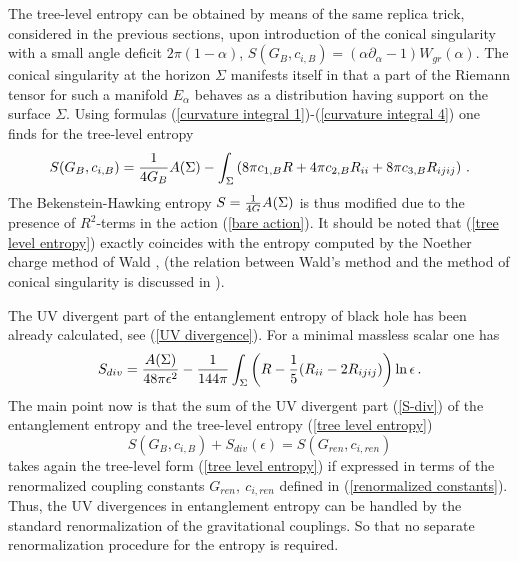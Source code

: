\documentclass[12pt]{article}
\def\be{\begin{eqnarray}}
\def\ee{\end{eqnarray}}
\def\lb{\label}
\def\o{\over}
\begin{document}
The tree-level entropy can be obtained by means of  the same replica trick, considered in the previous sections,  upon 
introduction of the conical singularity with a small angle deficit $2\pi(1-\alpha)$, $S(G_B,c_{i,B})=(\alpha\partial_\alpha-1)W_{gr}(\alpha)$. The conical singularity at
the horizon
$\Sigma$ manifests itself in that a part of the Riemann tensor for
such a
manifold $E_\alpha$ behaves as a distribution having support on
the surface
$\Sigma$.   Using formulas (\ref{curvature integral 1})-(\ref{curvature integral 4}) one finds
for the tree-level entropy
\begin{equation}
S(G_B, c_{i,B})= {1 \over 4G_B} A(\Sigma)-\int_{\Sigma} \left( 8\pi
c_{1,B} R
+4\pi c_{2,B}R_{ii}+8\pi  c_{3,B}R_{ijij} \right)\, .
\label{tree level entropy}
\end{equation}
The Bekenstein-Hawking entropy  $S={1 \over  4G}A(\Sigma)$ is thus
modified due to the  presence of 
$R^2$-terms in the action  (\ref{bare action}). 
It should be noted that (\ref{tree level entropy}) exactly coincides with the entropy
computed by
the Noether charge method of Wald \cite{Wald:1993nt}, \cite{Jacobson:1993vj} (the relation between Wald's method and the method of conical singularity is discussed in \cite{Iyer:1995kg}).

The UV divergent part of the entanglement entropy of black hole has been already calculated, see (\ref{UV divergence}).
For a minimal massless scalar one has 
\be
S_{div}={A(\Sigma)\o 48\pi\epsilon^2}-{1\o 144\pi}\int_\Sigma \left({R}-{1\o 5}({R}_{ii}-2{R}_{ijij})\right)\ln\epsilon\, .
\lb{S-div}
\ee
The main point now is that the sum of the UV divergent part (\ref{S-div}) of the entanglement
entropy
 and  the tree-level entropy
(\ref{tree level entropy})
\begin{equation}
S(G_B, c_{i,B})+S_{div}(\epsilon)=S(G_{ren}, c_{i, ren})
\label{entropy renormalized}
\end{equation}
takes again the tree-level form (\ref{tree level entropy}) if expressed
in terms of 
the renormalized coupling constants $G_{ren},  \  c_{i,  ren}$ defined in (\ref{renormalized constants}).
Thus, the UV divergences in  entanglement entropy can be handled by
the standard renormalization of the  gravitational couplings. So that
no separate
renormalization procedure for  the entropy is required.
\end{document}
